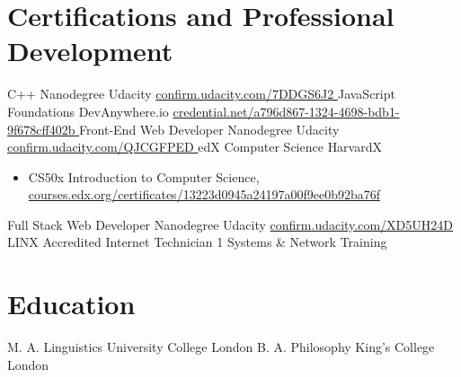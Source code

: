 \documentclass[10pt,a4paper,sans]{moderncv} %
\begin{document}

\section{Certifications and Professional Development}

        {C++ Nanodegree}
        {Udacity}{}
        { \href{ https://confirm.udacity.com/7DDGS6J2 }{ confirm.udacity.com/7DDGS6J2 } }
        {}
        {JavaScript Foundations}
        {DevAnywhere.io}{}
        { \href{ https://www.credential.net/a796d867-1324-4698-bdb1-9f678cff402b }{ credential.net/a796d867-1324-4698-bdb1-9f678cff402b } }
        {}
        {Front-End Web Developer Nanodegree}
        {Udacity}{}
        { \href{ https://confirm.udacity.com/QJCGFPED }{ confirm.udacity.com/QJCGFPED } }
        {}
        {edX Computer Science}
        {HarvardX}{}
        {}
        {            \begin{itemize}
                \item{ CS50x Introduction to Computer Science, \href{ https://courses.edx.org/certificates/13223d0945a24197a00f9ee0b92ba76f }{ courses.edx.org/certificates/13223d0945a24197a00f9ee0b92ba76f } }
            \end{itemize}
}
        {Full Stack Web Developer Nanodegree}
        {Udacity}{}
        { \href{ https://confirm.udacity.com/XD5UH24D }{ confirm.udacity.com/XD5UH24D } }
        {}
        {LINX Accredited Internet Technician 1}
        {Systems \& Network Training}{}
        {}
        {}


\section{Education}

    { M. A. Linguistics}
    { University College London }{}{}{}
    { B. A. Philosophy}
    { King's College London }{}{}{}
\end{document}
